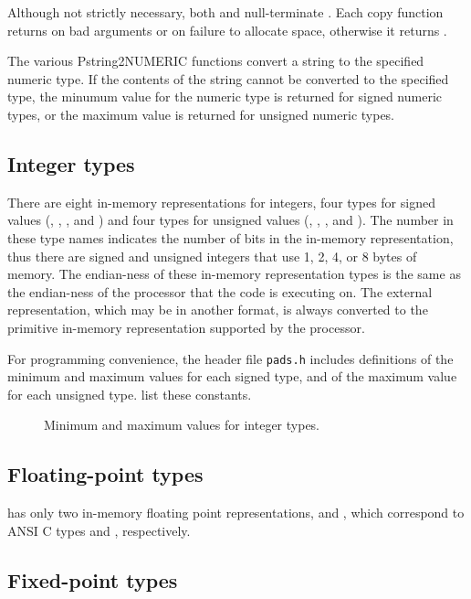 Although not strictly necessary, both  and
 null-terminate .  Each copy
function returns  on bad arguments or on failure to allocate
space, otherwise it returns .

The various Pstring2NUMERIC functions convert a string to the
specified numeric type.  If the contents of the string cannot be
converted to the specified type, the minumum value for the numeric
type is returned for signed numeric types, or the maximum value is
returned for unsigned numeric types.

\subsection{Integer types}

There are eight in-memory representations for integers, four types for
signed values (, , , and )
and four types for unsigned values (, , , and ).
The number in these type names indicates the number of bits in the in-memory representation,
thus there are signed and unsigned integers that use 1, 2, 4, or 8 bytes of memory.
The endian-ness of these in-memory representation types is the same as the
endian-ness of the processor that the code is executing on. 
The external representation, which may be in another format, is always converted
to the primitive in-memory representation supported by the processor.

For programming convenience, the header file {\tt pads.h} includes definitions of the minimum
and maximum values for each signed type, and of the maximum value for
each unsigned type.   list these constants.
\begin{figure}
\caption{Minimum and maximum values for \pads{} integer types.}
\label{fig:limits}
\end{figure}


\subsection{Floating-point types}

\PADSL{} has only two in-memory floating point representations,
 and , which correspond to ANSI C types 
and , respectively.

\subsection{Fixed-point types}

